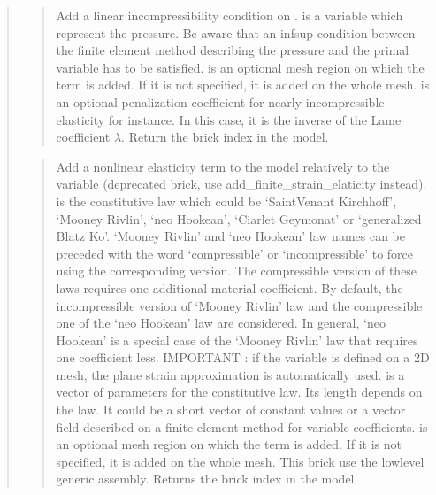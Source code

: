 \documentclass[a4paper,11pt,english]{sphinxmanual}
\begin{document}
\begin{quote}
\sphinxAtStartPar
{}
\begin{quote}

\sphinxAtStartPar
Add a linear incompressibility condition on . 
is a variable which represent the pressure. Be aware that an inf\sphinxhyphen{}sup
condition between the finite element method describing the pressure and the
primal variable has to be satisfied.  is an optional mesh region on
which the term is added. If it is not specified, it is added on the whole
mesh.  is an optional penalization coefficient for nearly
incompressible elasticity for instance. In this case, it is the inverse
of the Lame coefficient \(\lambda\). Return the brick index in the
model.
\end{quote}

\sphinxAtStartPar
{}
\begin{quote}

\sphinxAtStartPar
Add a nonlinear elasticity term to the model relatively to the
variable  (deprecated brick, use add\_finite\_strain\_elaticity
instead).  is the constitutive law which
could be ‘SaintVenant Kirchhoff’, ‘Mooney Rivlin’, ‘neo Hookean’,
‘Ciarlet Geymonat’ or ‘generalized Blatz Ko’.
‘Mooney Rivlin’ and ‘neo Hookean’ law names can be preceded with the word
‘compressible’ or ‘incompressible’ to force using the corresponding version.
The compressible version of these laws requires one additional material
coefficient. By default, the incompressible version of ‘Mooney Rivlin’ law
and the compressible one of the ‘neo Hookean’ law are considered. In
general, ‘neo Hookean’ is a special case of the ‘Mooney Rivlin’ law that
requires one coefficient less.
IMPORTANT : if the variable is defined on a 2D mesh, the plane strain
approximation is automatically used.
 is a vector of parameters for the constitutive law. Its length
depends on the law. It could be a short vector of constant values or a
vector field described on a finite element method for variable
coefficients.  is an optional mesh region on which the term
is added. If it is not specified, it is added on the whole mesh.
This brick use the low\sphinxhyphen{}level generic assembly.
Returns the brick index in the model.
\end{quote}


\end{quote}
\end{document}
